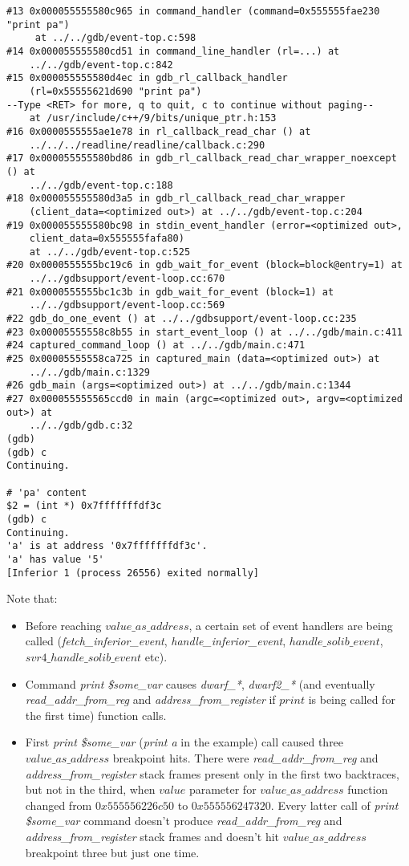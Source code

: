 \documentclass{report}
\begin{document}
\begin{verbatim}
#13 0x000055555580c965 in command_handler (command=0x555555fae230 "print pa")
     at ../../gdb/event-top.c:598
#14 0x000055555580cd51 in command_line_handler (rl=...) at 
    ../../gdb/event-top.c:842
#15 0x000055555580d4ec in gdb_rl_callback_handler 
    (rl=0x55555621d690 "print pa")
--Type <RET> for more, q to quit, c to continue without paging--
    at /usr/include/c++/9/bits/unique_ptr.h:153
#16 0x0000555555ae1e78 in rl_callback_read_char () at 
    ../../../readline/readline/callback.c:290
#17 0x000055555580bd86 in gdb_rl_callback_read_char_wrapper_noexcept () at 
    ../../gdb/event-top.c:188
#18 0x000055555580d3a5 in gdb_rl_callback_read_char_wrapper 
    (client_data=<optimized out>) at ../../gdb/event-top.c:204
#19 0x000055555580bc98 in stdin_event_handler (error=<optimized out>, 
    client_data=0x555555fafa80)
    at ../../gdb/event-top.c:525
#20 0x0000555555bc19c6 in gdb_wait_for_event (block=block@entry=1) at 
    ../../gdbsupport/event-loop.cc:670
#21 0x0000555555bc1c3b in gdb_wait_for_event (block=1) at 
    ../../gdbsupport/event-loop.cc:569
#22 gdb_do_one_event () at ../../gdbsupport/event-loop.cc:235
#23 0x00005555558c8b55 in start_event_loop () at ../../gdb/main.c:411
#24 captured_command_loop () at ../../gdb/main.c:471
#25 0x00005555558ca725 in captured_main (data=<optimized out>) at 
    ../../gdb/main.c:1329
#26 gdb_main (args=<optimized out>) at ../../gdb/main.c:1344
#27 0x000055555565ccd0 in main (argc=<optimized out>, argv=<optimized out>) at 
    ../../gdb/gdb.c:32
(gdb) 
(gdb) c
Continuing.

# 'pa' content
$2 = (int *) 0x7fffffffdf3c
(gdb) c
Continuing.
'a' is at address '0x7fffffffdf3c'.
'a' has value '5'
[Inferior 1 (process 26556) exited normally] 
\end{verbatim}
Note that:
\begin{itemize}
\item Before reaching  $value\_as\_address$, a certain set of event handlers are being called (\textit{fetch\_inferior\_event}, \textit{handle\_inferior\_event}, $handle\_solib\_event$, $svr4\_handle\_solib\_event$ etc). 
\item Command \textit{print \$some\_var} causes \textit{dwarf\_*}, \textit{dwarf2\_*} (and eventually \textit{read\_addr\_from\_reg} and \textit{address\_from\_register} if $print$ is being called for the first time) function calls.
\item First \textit{print \$some\_var} (\textit{print a} in the example) call caused three $value\_as\_address$ breakpoint hits. There were \textit{read\_addr\_from\_reg} and \textit{address\_from\_register} stack frames present only in the first two backtraces, but not in the third, when $value$ parameter for $value\_as\_address$ function changed from $0x555556226c50$ to $0x555556247320$.
Every latter call of \textit{print \$some\_var} command doesn't produce \textit{read\_addr\_from\_reg} and \textit{address\_from\_register} stack frames and doesn't hit $value\_as\_address$ breakpoint three but just one time.
\end{itemize}
\end{document}
